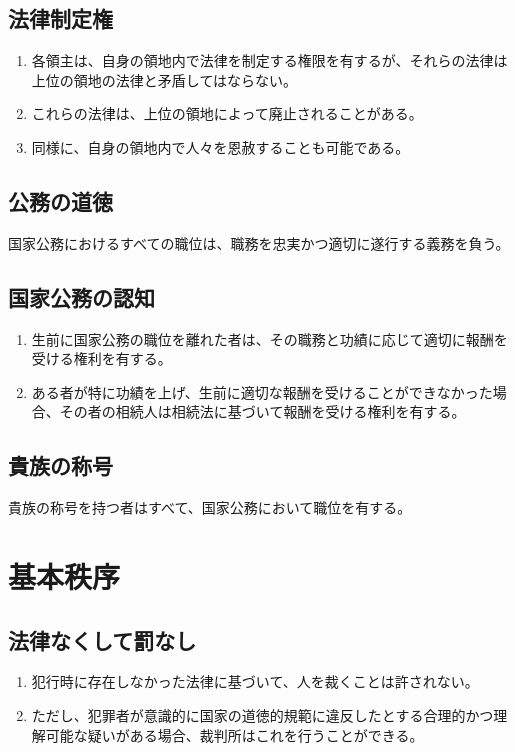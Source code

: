 \documentclass{article}
\begin{document}
\subsection{法律制定権}
\begin{enumerate}
    \item 各領主は、自身の領地内で法律を制定する権限を有するが、それらの法律は上位の領地の法律と矛盾してはならない。
    \item これらの法律は、上位の領地によって廃止されることがある。
    \item 同様に、自身の領地内で人々を恩赦することも可能である。
\end{enumerate}

\subsection{公務の道徳}
国家公務におけるすべての職位は、職務を忠実かつ適切に遂行する義務を負う。

\subsection{国家公務の認知}
\begin{enumerate}
    \item 生前に国家公務の職位を離れた者は、その職務と功績に応じて適切に報酬を受ける権利を有する。
    \item ある者が特に功績を上げ、生前に適切な報酬を受けることができなかった場合、その者の相続人は相続法に基づいて報酬を受ける権利を有する。
\end{enumerate}

\subsection{貴族の称号}
貴族の称号を持つ者はすべて、国家公務において職位を有する。

\newpage
\section{基本秩序}
\subsection{法律なくして罰なし}\label{npwl}
\begin{enumerate}
    \item 犯行時に存在しなかった法律に基づいて、人を裁くことは許されない。
    \item ただし、犯罪者が意識的に国家の道徳的規範に違反したとする合理的かつ理解可能な疑いがある場合、裁判所はこれを行うことができる。
\end{enumerate}
\end{document}
